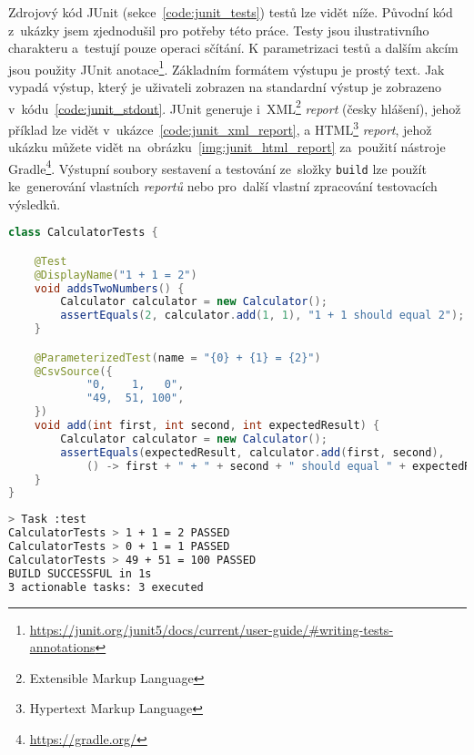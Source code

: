 Zdrojový kód JUnit (sekce~\ref{code:junit_tests}) testů lze vidět níže. Původní kód~\cite{JUnitExmapleRepository}
z~ukázky jsem zjednodušil pro potřeby této práce. Testy jsou ilustrativního charakteru a~testují pouze operaci sčítání. K parametrizaci testů a dalším akcím jsou použity JUnit anotace\footnote{\href{https://junit.org/junit5/docs/current/user-guide/\#writing-tests-annotations}{https://junit.org/junit5/docs/current/user-guide/\#writing-tests-annotations}}.
Základním formátem výstupu je prostý text. Jak vypadá výstup, který je uživateli zobrazen na standardní výstup je zobrazeno v~kódu~\ref{code:junit_stdout}. JUnit generuje i~XML\footnote{Extensible Markup Language} \textit{report} (česky hlášení), jehož příklad lze vidět v~ukázce~\ref{code:junit_xml_report}, a  HTML\footnote{Hypertext Markup Language} \textit{report}, jehož ukázku můžete vidět na~obrázku~\ref{img:junit_html_report} za~použití nástroje Gradle\footnote{\href{https://gradle.org/}{https://gradle.org/}}. Výstupní soubory sestavení a testování ze~složky \texttt{build} lze použít ke~generování vlastních \textit{reportů} nebo pro~další vlastní zpracování testovacích výsledků.

\lstset{frame=single}
\begin{lstlisting}[language=Java, basicstyle=\footnotesize\ttfamily, label={code:junit_tests}, caption=Zdrojový kód dvou testů napsaných ve~frameworku JUnit. Druhý test je ukázkou parametrizovaného testu.]
    class CalculatorTests {

	@Test
	@DisplayName("1 + 1 = 2")
	void addsTwoNumbers() {
		Calculator calculator = new Calculator();
		assertEquals(2, calculator.add(1, 1), "1 + 1 should equal 2");
	}

	@ParameterizedTest(name = "{0} + {1} = {2}")
	@CsvSource({
			"0,    1,   0",
			"49,  51, 100",
	})
	void add(int first, int second, int expectedResult) {
		Calculator calculator = new Calculator();
		assertEquals(expectedResult, calculator.add(first, second),
			() -> first + " + " + second + " should equal " + expectedResult);
	}
}
\end{lstlisting}
\vspace{0.7em}

\begin{lstlisting}[language=bash, basicstyle=\footnotesize\ttfamily, label={code:junit_stdout}, caption=Příklad standardního výstupu JUnit testu{,} který je tištěn do~konzole. Jedná se o~jednoduchý přehled základních informací o~výsledku testovacího běhu.]
> Task :test
CalculatorTests > 1 + 1 = 2 PASSED
CalculatorTests > 0 + 1 = 1 PASSED
CalculatorTests > 49 + 51 = 100 PASSED
BUILD SUCCESSFUL in 1s
3 actionable tasks: 3 executed
\end{lstlisting}
\vspace{0.7em}

